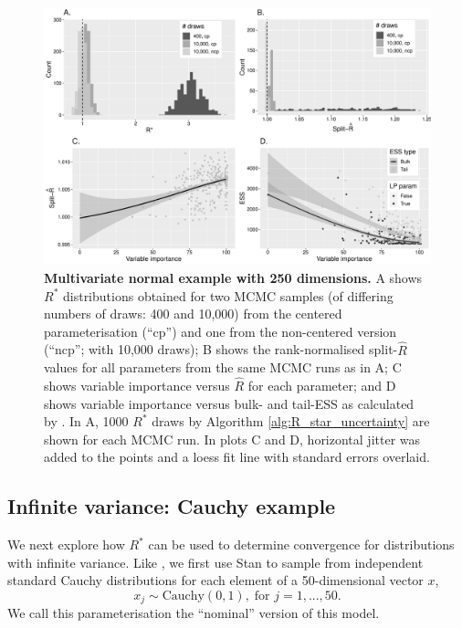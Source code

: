 \documentclass{article}
\begin{document}
\begin{figure}[!htb]
	\centerline{\includegraphics[width=1\textwidth]{../output/mvt_three.pdf}}
	\caption{\textbf{Multivariate normal example with 250 dimensions.} A shows $R^*$ distributions obtained for two MCMC samples (of differing numbers of draws: 400 and 10,000) from the centered parameterisation (``cp'') and one from the non-centered version (``ncp''; with 10,000 draws); B shows the rank-normalised split-$\widehat{R}$ values for all parameters from the same MCMC runs as in A; C shows variable importance versus $\widehat{R}$ for each parameter; and D shows variable importance versus bulk- and tail-ESS as calculated by \cite{vehtari2019rank}. In A, 1000 $R^*$ draws by Algorithm \ref{alg:R_star_uncertainty} are shown for each MCMC run. In plots C and D, horizontal jitter was added to the points and a loess fit line with standard errors overlaid.}
	\label{fig:mvt}
\end{figure}

\subsection{Infinite variance: Cauchy example}\label{sec:cauchy}
We next explore how $R^*$ can be used to determine convergence for distributions with infinite variance. Like \cite{vehtari2019rank}, we first use Stan to sample from independent standard Cauchy distributions for each element of a 50-dimensional vector $x$,
%
\begin{equation}
x_j\sim \text{Cauchy}(0, 1),\; \text{for } j=1,...,50.
\end{equation}
%
We call this parameterisation the ``nominal'' version of this model.
\end{document}
